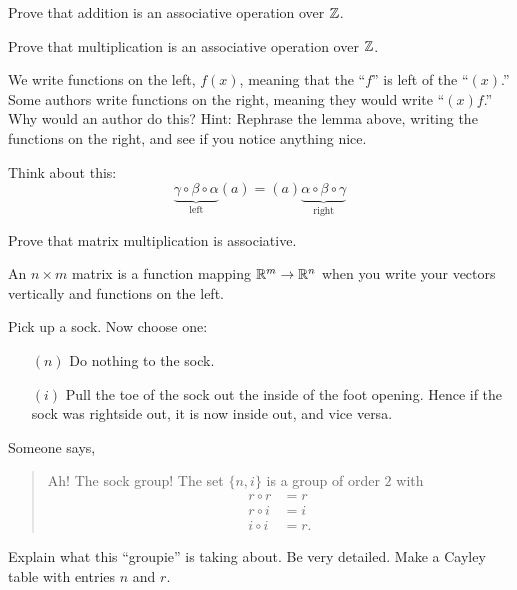 \documentclass{ximera}
\begin{document}
\begin{exercise}
  Prove that addition is an associative operation  over $\mathbb Z$.
\end{exercise}

\begin{exercise}
  Prove that multiplication is an associative operation  over $\mathbb Z$.
\end{exercise}



\begin{exercise}
  We write functions on the left, $f(x)$, meaning that the ``$f$'' is
  left of the ``$(x)$.''  Some authors write functions on the right,
  meaning they would write ``$(x)f$.'' Why would an author do this? Hint:
  Rephrase the lemma above, writing the functions on the right, and
  see if you notice anything nice.
  \begin{hint}
    Think about this:
    \[
    \underbrace{\gamma\circ\beta\circ\alpha}_{\text{left}}(a) = (a)\underbrace{\alpha\circ\beta\circ\gamma}_{\text{right}}
    \]
  \end{hint}
\end{exercise}



\begin{exercise}
  Prove that matrix multiplication is associative.
  \begin{hint}
    An $n\times m$ matrix is a function mapping $\mathbb R^m\to \mathbb R^n$ when
    you write your vectors vertically and functions on the left.
  \end{hint}
\end{exercise}




\begin{exercise}
  Pick up a sock. Now choose one:
  \begin{enumerate}
  \item[$(n)$] Do nothing to the sock.
  \item[$(i)$] Pull the toe of the sock out the inside of the foot
    opening. Hence if the sock was rightside out, it is now inside
    out, and vice versa.
  \end{enumerate}
  Someone says,
  \begin{quote}
    Ah! The sock group! The set $\{n,i\}$ is a group of order $2$ with
    \begin{align*}
      r\circ r &= r\\
  r\circ i &= i\\
  i\circ i &= r.
  \end{align*}
  \end{quote}
  Explain what this ``groupie'' is taking about. Be very
  detailed. Make a Cayley table with entries $n$ and $r$. 
\end{exercise}
\end{document}
